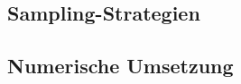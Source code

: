 
\subsection{Sampling-Strategien} %
\label{sub:grb:rb:sampling_strategien}


\subsection{Numerische Umsetzung} %
\label{sub:grb:rb:numerische_umsetzung}



